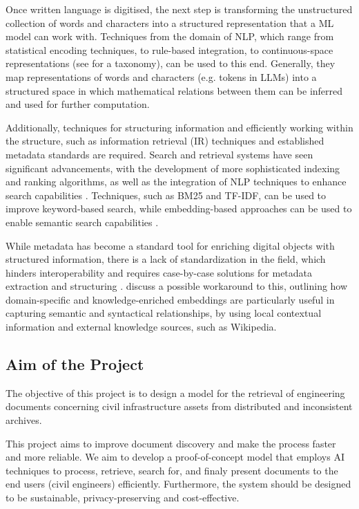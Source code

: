 Once written language is digitised, the next step is transforming the unstructured collection of words and characters into a structured representation that a ML model can work with.
Techniques from the domain of NLP, which range from statistical encoding techniques, to rule-based integration, to continuous-space representations (see \textcite{patilSurveyTextRepresentation2023} for a taxonomy), can be used to this end.
Generally, they map representations of words and characters (e.g. tokens in LLMs) into a structured space in which mathematical relations between them can be inferred and used for further computation.

Additionally, techniques for structuring information and efficiently working within the structure, such as information retrieval (IR) techniques and established metadata standards are required.
Search and retrieval systems have seen significant advancements, with the development of more sophisticated indexing and ranking algorithms, as well as the integration of NLP techniques to enhance search capabilities \cite{shalagin2024survey}.
Techniques, such as BM25 and TF-IDF, can be used to improve keyword-based search, while embedding-based approaches can be used to enable semantic search capabilities \cite{patilSurveyTextRepresentation2023}.

While metadata has become a standard tool for enriching digital objects with structured information, there is a lack of standardization in the field, which hinders interoperability and requires case-by-case solutions for metadata extraction and structuring \cite{ulrichUnderstandingNatureMetadata2022}.
\textcite{patilSurveyTextRepresentation2023} discuss a possible workaround to this, outlining how domain-specific and knowledge-enriched embeddings are particularly useful in capturing semantic and syntactical relationships, by using local contextual information and external knowledge sources, such as Wikipedia.

\subsection{Aim of the Project}


The objective of this project is to design a model for the retrieval of engineering documents concerning civil infrastructure assets from distributed and inconsistent archives. 

This project aims to improve document discovery and make the process faster and more reliable.
We aim to develop a proof-of-concept model that employs AI techniques to process, retrieve, search for, and finaly present documents to the end users (civil engineers) efficiently. 
Furthermore, the system should be designed to be sustainable, privacy-preserving and cost-effective. 

